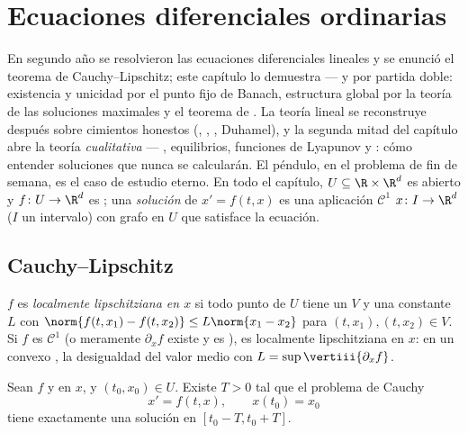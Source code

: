 \chapter{Ecuaciones diferenciales ordinarias}\label{ch:b3:ode}

En segundo año se resolvieron las ecuaciones diferenciales lineales y se
enunció el teorema de Cauchy--Lipschitz; este capítulo lo demuestra ---
y por partida doble: existencia y unicidad por el punto fijo de Banach,
estructura global por la teoría de las
soluciones maximales y el teorema de . La teoría lineal se reconstruye después sobre
cimientos honestos (,
,
, Duhamel), y la
segunda mitad del capítulo abre la teoría \emph{cualitativa} ---
, equilibrios,
funciones de Lyapunov y
: cómo
entender soluciones que nunca se calcularán. El péndulo, en el problema
de fin de semana, es el caso de estudio eterno. En todo el capítulo,
$U \subseteq \R\times\R^d$ es abierto y $f \colon U \to \R^d$ es
; una \emph{solución} de
$x' = f(t, x)$ es una aplicación $\mathcal C^1$ $x \colon I \to \R^d$
($I$ un intervalo) con grafo en $U$ que satisface la ecuación.

\section{Cauchy--Lipschitz}

\begin{definition}\label{def:b3:ode:lipschitz}
$f$ es \emph{localmente lipschitziana en $x$} si todo punto de $U$ tiene un
 $V$ y una constante $L$ con
$\norm{f(t, x_1) - f(t, x_2)} \leq L\norm{x_1 -
x_2}$ para $(t, x_1), (t, x_2) \in V$. Si $f$ es $\mathcal
C^1$ (o meramente $\partial_xf$ existe y es
), es localmente
lipschitziana en $x$: en un 
convexo , la desigualdad del
valor medio con $L =
\sup\vertiii{\partial_xf}$.
\end{definition}

\begin{theorem}
\label{thm:b3:ode:cauchylipschitz}
Sean $f$  y
 en $x$, y $(t_0,
x_0) \in U$. Existe $T > 0$ tal que el problema de Cauchy
\[
x' = f(t, x), \qquad x(t_0) = x_0
\]
tiene exactamente una solución en $[t_0 - T, t_0 +
T]$.
\end{theorem}

